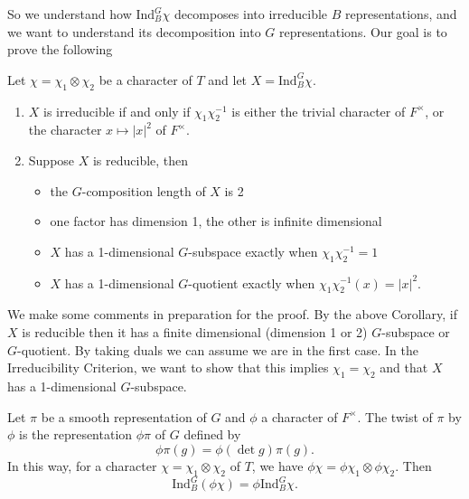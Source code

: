 So we understand how $\mathrm{Ind}_B^G \chi$ decomposes into irreducible $B$ representations, and we want to understand its decomposition into $G$ representations. Our goal is to prove the following

\begin{thm}
    Let $\chi = \chi_1 \otimes \chi_2$ be a character of $T$ and let $X = \mathrm{Ind}_B^G \chi$.
    \begin{enumerate}
        \item $X$ is irreducible if and only if $\chi_1\chi_2^{-1}$ is either the trivial character of $F^\times$, or the character $x \mapsto |x|^2$ of $F^\times$.
        \item Suppose $X$ is reducible, then \begin{itemize}
            \item the $G$-composition length of $X$ is 2
            \item one factor has dimension 1, the other is infinite dimensional
            \item $X$ has a 1-dimensional $G$-subspace exactly when $\chi_1\chi_2^{-1}=1$
            \item $X$ has a 1-dimensional $G$-quotient exactly when $\chi_1\chi_2^{-1}(x) = |x|^2$.
        \end{itemize}
    \end{enumerate}
\end{thm}

We make some comments in preparation for the proof. By the above Corollary, if $X$ is reducible then it has a finite dimensional (dimension 1 or 2) $G$-subspace or $G$-quotient. By taking duals we can assume we are in the first case. In the Irreducibility Criterion, we want to show that this implies $\chi_1 = \chi_2$ and that $X$ has a 1-dimensional $G$-subspace.

\begin{defn}
    Let $\pi$ be a smooth representation of $G$ and $\phi$ a character of $F^\times$. The twist of $\pi$ by $\phi$ is the representation $\phi\pi$ of $G$ defined by 
    $$\phi \pi(g) = \phi (\det g)\pi(g).$$
    In this way, for a character $\chi=\chi_1 \otimes \chi_2$ of $T$, we have $\phi\chi = \phi\chi_1 \otimes \phi\chi_2$. Then 
    $$\mathrm{Ind}_B^G(\phi\chi) = \phi \mathrm{Ind}_B^G \chi.$$
\end{defn}


